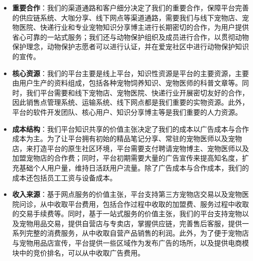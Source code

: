 \documentclass[a4paper]{ctexart}
\begin{document}
\begin{itemize}
  \item \textbf{重要合作}：我们的渠道通路和客户细分决定了我们的重要合作，保障平台完善的供应链系统、大咖分享、线下网点等渠道通路，需要我们与线下宠物店、宠物医院、快递行业和专业宠物知识分享博主进行长期密切的合作，为用户提供省心可靠的一站式服务；我们还与动物保护组织及成员进行合作，以贯彻动物保护理念，动物保护志愿者可以进行认证，并在爱宠社区中进行动物保护知识的宣传。
  \item \textbf{核心资源}：我们的平台主要是线上平台，知识性资源是平台的主要资源，主要由用户生产的资料组成，包括各种宠物饲养知识、宠物医师的科普文章等。同时，我们平台需要和线下宠物店、宠物医院、快递行业开展密切友好的合作，因此销售点管理系统、运输系统、线下网点都是我们重要的实物资源。此外，平台的软件开发团队、核心用户、知识分享博主等是我们重要的人力资源。
  \item \textbf{成本结构}：我们平台知识共享的价值主张决定了我们的成本以广告成本与合作成本为主。为了让平台拥有初始的精品笔记分享、常驻的宠物医师以及宠物店，来打造平台的原生社区环境，平台需要支付聘请宠物博主、宠物医师以及加盟宠物店的合作费；同时，平台初期需要大量的广告宣传来提高知名度，扩充基础个人用户量，维持日活跃用户流量。除了广告成本与合作成本，我们的成本还包括员工工资与设备成本。
  \item \textbf{收入来源}：基于网点服务的价值主张，平台支持第三方宠物店交易以及宠物医院问诊，从中收取平台费用，包括合作过程中收取的加盟费、服务过程中收取的交易手续费等。同时，基于一站式服务的价值主张，我们的平台支持宠物以及宠物用品交易，提供自营店与专卖店，掌握供应链，完善售后客服，提供一系列完整的消费服务，从中收取自营产品销售的利润。此外，为了便于宠物店与宠物用品店宣传，平台提供一些区域作为发布广告的场所，以及提供电商模块中的竞价排名，可以从中收取广告费用。
\end{itemize}
\end{document}
